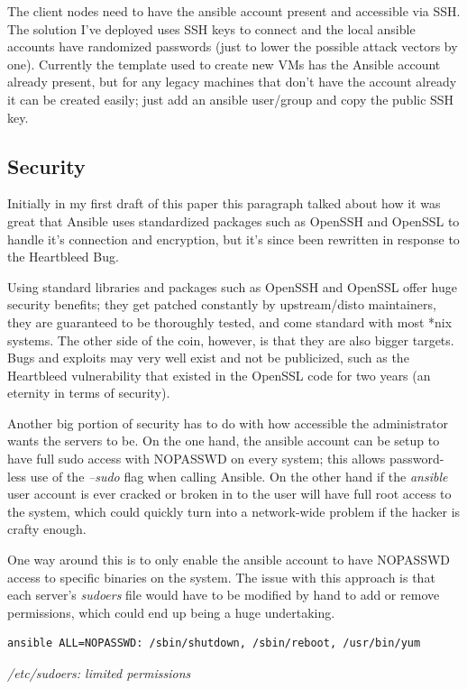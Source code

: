 \documentclass[a4paper]{article}
\begin{document}
The client nodes need to have the ansible account present and accessible via SSH. The solution I've deployed uses SSH keys to connect and the local ansible accounts have randomized passwords (just to lower the possible attack vectors by one). Currently the template used to create new VMs has the Ansible account already present, but for any legacy machines that don't have the account already it can be created easily; just add an ansible user/group and copy the public SSH key.

\subsection{Security}
Initially in my first draft of this paper this paragraph talked about how it was great that Ansible uses standardized packages such as OpenSSH and OpenSSL to handle it's connection and encryption, but it's since been rewritten in response to the Heartbleed Bug.

Using standard libraries and packages such as OpenSSH and OpenSSL offer huge security benefits; they get patched constantly by upstream/disto maintainers, they are guaranteed to be thoroughly tested, and come standard with most *nix systems. The other side of the coin, however, is that they are also bigger targets. Bugs and exploits may very well exist and not be publicized, such as the Heartbleed vulnerability that existed in the OpenSSL code for two years (an eternity in terms of security).

Another big portion of security has to do with how accessible the administrator wants the servers to be. On the one hand, the ansible account can be setup to have full sudo access with NOPASSWD on every system; this allows password-less use of the \textit{--sudo} flag when calling Ansible. On the other hand if the \textit{ansible} user account is ever cracked or broken in to the user will have full root access to the system, which could quickly turn into a network-wide problem if the hacker is crafty enough.

One way around this is to only enable the ansible account to have NOPASSWD access to specific binaries on the system. The issue with this approach is that each server's \textit{sudoers} file would have to be modified by hand to add or remove permissions, which could end up being a huge undertaking.

\begin{lstlisting}[language=nagconf]
ansible ALL=NOPASSWD: /sbin/shutdown, /sbin/reboot, /usr/bin/yum
\end{lstlisting}
\hfill \textit{/etc/sudoers: limited permissions}\\
\end{document}

